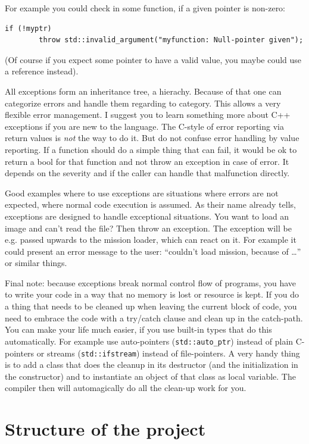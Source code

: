 \documentclass[english,a4paper,12pt]{report}
\begin{document}
For example you could check in some function, if a given pointer is
non-zero:
\begin{verbatim}
if (!myptr)
        throw std::invalid_argument("myfunction: Null-pointer given");
\end{verbatim}
(Of course if you expect some pointer to have a valid value, you maybe
could use a reference instead).

All exceptions form an inheritance tree, a hierachy. Because of that one
can categorize errors and handle them regarding to category. This allows
a very flexible error management. I suggest you to learn something more
about C++ exceptions if you are new to the language. The C-style of
error reporting via return values is \emph{not} the way to do it. But do
not confuse error handling by value reporting. If a function should do a
simple thing that can fail, it would be ok to return a bool for that
function and not throw an exception in case of error. It depends on the
severity and if the caller can handle that malfunction directly.

Good examples where to use exceptions are situations where errors are
not expected, where normal code execution is assumed. As their name
already tells, exceptions are designed to handle exceptional situations.
You want to load an image and can't read the file? Then throw an
exception. The exception will be e.g. passed upwards to the mission
loader, which can react on it. For example it could present an error
message to the user: ``couldn't load mission, because of \ldots'' or
similar things.

Final note: because exceptions break normal control flow of programs,
you have to write your code in a way that no memory is lost or resource
is kept. If you do a thing that needs to be cleaned up when leaving the
current block of code, you need to embrace the code with a try/catch
clause and clean up in the catch-path. You can make your life much
easier, if you use built-in types that do this automatically. For
example use auto-pointers (\texttt{std::auto\_ptr}) instead of plain
C-pointers or streams (\texttt{std::ifstream}) instead of file-pointers.
A very handy thing is to add a class that does the cleanup in its
destructor (and the initialization in the constructor) and to
instantiate an object of that class as local variable. The compiler then
will automagically do all the clean-up work for you.


\chapter{Structure of the project}
\end{document}
